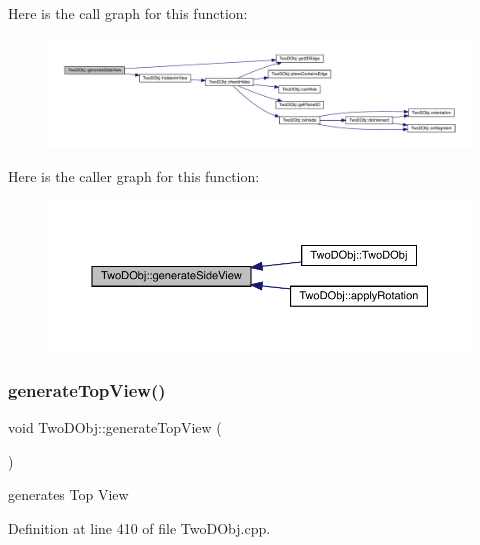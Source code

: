 Here is the call graph for this function\+:
\nopagebreak
\begin{figure}[H]
\begin{center}
\leavevmode
\includegraphics[width=350pt]{class_two_d_obj_a19b8f32d11ae455e15297aefa0028967_cgraph}
\end{center}
\end{figure}
Here is the caller graph for this function\+:
\nopagebreak
\begin{figure}[H]
\begin{center}
\leavevmode
\includegraphics[width=350pt]{class_two_d_obj_a19b8f32d11ae455e15297aefa0028967_icgraph}
\end{center}
\end{figure}
\mbox{\label{class_two_d_obj_a3e4e17ffd7b54bf442bfce6387ed4c27}} 
\subsubsection{\texorpdfstring{generate\+Top\+View()}{generateTopView()}}
{\footnotesize\ttfamily void Two\+D\+Obj\+::generate\+Top\+View (\begin{DoxyParamCaption}{ }\end{DoxyParamCaption})}



generates Top View 



Definition at line 410 of file Two\+D\+Obj.\+cpp.

